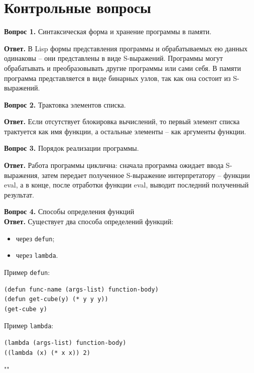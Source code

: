 \documentclass[12pt]{report}
\begin{document}
\section*{Контрольные вопросы}
\textbf{Вопрос 1.} Синтаксическая форма и хранение программы в памяти.

\textbf{Ответ.}
В Lisp формы представления программы и обрабатываемых ею данных одинаковы – они представлены в виде S-выражений. Программы могут обрабатывать и преобразовывать другие программы или сами себя. В памяти программа представляется в виде бинарных узлов, так как она состоит из S-выражений.\newline

\textbf{Вопрос 2.} Трактовка элементов списка. 

\textbf{Ответ.}
Если отсутствует блокировка вычислений, то первый элемент списка трактуется как имя функции, а остальные элементы – как аргументы функции.\newline
	
\textbf{Вопрос 3.} Порядок реализации программы.

\textbf{Ответ.}
Работа программы циклична: сначала программа ожидает ввода S-выражения, затем передает полученное S-выражение интерпретатору – функции eval, а в конце, после отработки функции eval, выводит последний полученный результат.\newline

\textbf{Вопрос 4.} Способы определения функций\\
\indent\textbf{Ответ.} Существует два способа определений функций:

\begin{itemize}
	\item через \texttt{defun};
	\item через \texttt{lambda}.
\end{itemize}

Пример \texttt{defun}:
\begin{lstlisting}
(defun func-name (args-list) function-body)
(defun get-cube(y) (* y y y))
(get-cube y)
\end{lstlisting}

Пример \texttt{lambda}:
\begin{lstlisting}
(lambda (args-list) function-body)
((lambda (x) (* x x)) 2)
\end{lstlisting} ""
	
	
\end{document}
